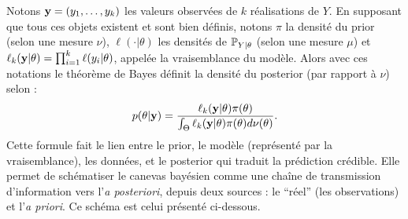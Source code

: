 Notons $\mathbf{y} = (y_1,\dots,y_k)$ les valeurs observées de $k$ réalisations de $Y$. En supposant que tous ces objets existent et sont bien définis, notons $\pi$ la densité du prior (selon une mesure $\nu$), $\ell(\cdot|\theta)$ les densités de $\mathbb{P}_{Y|\theta}$ (selon une mesure $\mu$) et  $\ell_k(\mathbf{y}|\theta)=\prod_{i=1}^k\ell(y_i|\theta)$, appelée la vraisemblance du modèle. Alors avec ces notations le théorème de Bayes définit la densité du posterior (par rapport à $\nu$) selon :
    \begin{equation}
        p(\theta|\mathbf{y}) = \frac{\ell_k(\mathbf{y}|\theta)\pi(\theta)}{\int_{\Theta}\ell_k(\mathbf{y}|\theta)\pi(\theta)d\nu(\theta)  }.
    \end{equation}
Cette formule fait le lien entre le prior, le modèle (représenté par la vraisemblance), les données, et le posterior qui traduit la prédiction crédible. Elle permet de schématiser le canevas bayésien comme une chaîne de transmission d'information vers l'\emph{a posteriori}, depuis deux sources : le ``réel'' (les observations) et l'\emph{a priori}. Ce schéma est celui présenté ci-dessous.
    \begin{figure}[h]
        \centering
    \end{figure}

